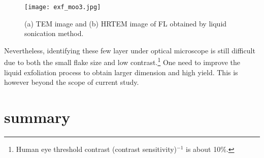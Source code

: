 \begin{figure}[htb]
\centering
\texttt{[image: exf\_moo3.jpg]}
\caption[TEM images of exfoliated ]{(a) TEM image and (b) HRTEM image of FL  obtained by liquid sonication method.}
\label{fig:motem}
\end{figure}

Nevertheless, identifying these few layer  under optical microscope is still difficult due to both the small flake size and low contrast.\footnote{Human eye threshold contrast (contrast sensitivity)$^{-1}$ is about 10\%.} One need to improve the liquid exfoliation process to obtain larger dimension and high yield. This is however beyond the scope of current study.

\section{summary}

